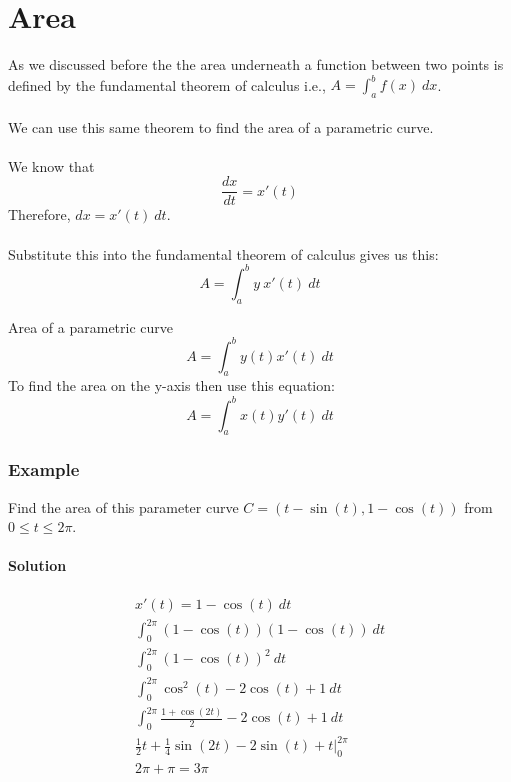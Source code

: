 \documentclass[./MATH-115-Notes.tex]{subfiles}
\begin{document}
\section{Area}
As we discussed before the the area underneath a function between two points is defined by the fundamental theorem of calculus i.e., $A = \int_a^b f(x)\ dx$.
\\~\\
We can use this same theorem to find the area of a parametric curve.
\\~\\
We know that 
$$
    \frac{dx}{dt} = x'(t)
$$
Therefore, $ dx = x'(t)\ dt $.
\\~\\
Substitute this into the fundamental theorem of calculus gives us this:
$$
    A = \int_a^b y\ x'(t)\ dt
$$
\begin{paperbox}{Area of a parametric curve}
    \begin{equation}
        A = \int_a^b y(t)x'(t)\ dt
    \end{equation}
    To find the area on the y-axis then use this equation:
    \begin{equation}
        A = \int_a^b x(t)y'(t)\ dt
    \end{equation}
\end{paperbox}
\subsubsection{Example}
Find the area of this parameter curve $ C = (t-\sin(t), 1-\cos(t)) $ from $ 0 \le t \le 2\pi $.
\paragraph{Solution}
\begin{gather*}
    x'(t) = 1-\cos(t)\ dt\\
    \int_0^{2\pi} (1-\cos(t))(1-\cos(t))\ dt\\
    \int_0^{2\pi} (1-\cos(t))^2\ dt\\
    \int_0^{2\pi} \cos^2(t) - 2\cos(t) + 1\ dt\\
    \int_0^{2\pi} \frac{1+\cos(2t)}{2} - 2\cos(t) + 1\ dt\\
    \frac{1}{2}t + \frac{1}{4}\sin(2t) - 2\sin(t) + t\biggl|_0^{2\pi}\\
    2\pi + \pi = 3\pi
\end{gather*}
\end{document}
